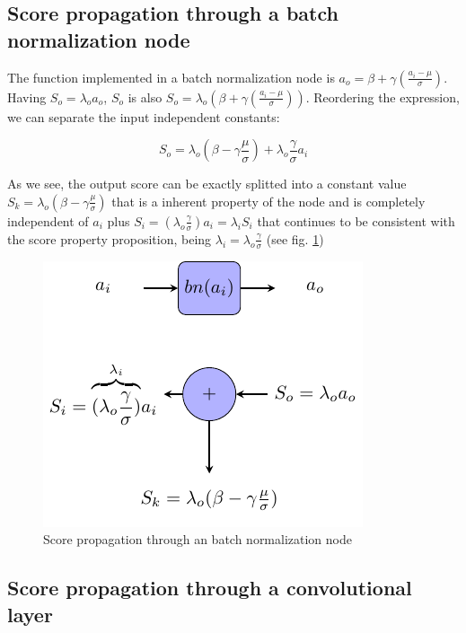 \documentclass[preprint]{elsarticle}
\theoremstyle{definition} %
\theoremstyle{remark}
\begin{document}
\subsection{Score propagation through a batch normalization node} 

The function implemented in a batch normalization node is $a_o = \beta + \gamma (\frac{a_i - \mu}{\sigma})$. Having $S_o = \lambda_o a_o$, $S_o$ is also $S_o = \lambda_o ( \beta + \gamma (\frac{a_i - \mu}{\sigma}))$. Reordering the expression, we can separate the input independent constants: 

\begin{equation}
	S_o = \lambda_o (\beta - \gamma \frac{\mu}{\sigma}) + \lambda_o \frac{\gamma}{\sigma}a_i
\end{equation}

As we see, the output score can be exactly splitted into a constant value $S_k = \lambda_o (\beta - \gamma \frac{\mu}{\sigma})$ that is a inherent property of the node and is completely independent of $a_i$ plus $S_i = (\lambda_o \frac{\gamma}{\sigma})a_i = \lambda_i S_i$ that continues to be consistent with the score property proposition, being $\lambda_i = \lambda_o \frac{\gamma}{\sigma}$ (see fig. \ref{fig:score_bn})

\begin{figure}[h!]
	\centering
	\includegraphics{figures/score_bn.pdf}
	\caption{Score propagation through an batch normalization node}
	\label{fig:score_bn}
\end{figure}

\subsection{Score propagation through a convolutional layer}
\end{document}
